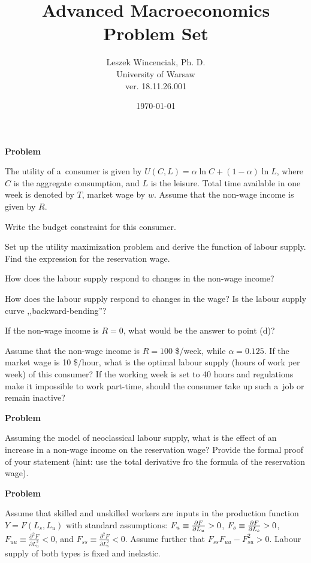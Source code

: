 \documentclass[a4paper, notitlepage, 11pt]{article}
\title{Advanced Macroeconomics Problem Set}
\author{Leszek Wincenciak, Ph. D.\\ University of Warsaw\\ ver. 18.11.26.001}
\date{\today}
\newcounter{zadlicz}[section]%
\newcommand{\tytul}[2]{\setcounter{equation}{0}\addtocounter{zadlicz}{1}\vspace{\abovedisplayskip}\noindent\textbf{#1\ \thezadlicz #2}}%
\newcommand{\Deriv}[2]{\ensuremath\frac{\partial #1}{\partial #2}\ensuremath}%
\begin{document}
\maketitle

\tytul{Problem}{}

\noindent%
The utility of a~consumer is given by $U(C,L)=\alpha\ln C + (1-\alpha)\ln L$, where $C$ is the aggregate consumption, and $L$ is the leisure. Total time available in one week is denoted by $T$, market wage by $w$. Assume that the non-wage income is given by $R$.

\begin{wylicz}
\item Write the budget constraint for this consumer.
\item Set up the utility maximization problem and derive the function of labour supply. Find the expression for the reservation wage.
\item How does the labour supply respond to changes in the non-wage income?
\item How does the labour supply respond to changes in the wage? Is the labour supply curve ,,backward-bending''?
\item If the non-wage income is $R=0$, what would be the answer to point (d)?
\end{wylicz}

Assume that the non-wage income is $R=100$ \$/week, while $\alpha=0.125$. If the market wage is 10 \$/hour, what is the optimal labour supply (hours of work per week) of this consumer? If the working week is set to 40 hours and regulations make it impossible to work part-time, should the consumer take up such a~job or remain inactive?

\tytul{Problem}{}

\noindent%
Assuming the model of neoclassical labour supply, what is the effect of an increase in a non-wage income on the reservation wage? Provide the formal proof of your statement (hint: use the total derivative fro the formula of the reservation wage).

\tytul{Problem}{}

\noindent%
Assume that skilled and unskilled workers are inputs in the production function $Y = F(L_s,L_u)$ with standard assumptions: $F_u\equiv \Deriv{F}{L_u}>0$, $F_s\equiv\Deriv{F}{L_s}>0$,
$F_{uu}\equiv\frac{\partial^2F}{\partial L_u^2}<0$, and
$F_{ss}\equiv\frac{\partial^2F}{\partial L_s^2}<0$. Assume further that $F_{ss}F_{uu}-F^2_{su}>0$. Labour supply of both types is fixed and inelastic.
\end{document}
